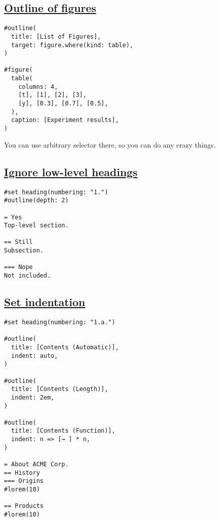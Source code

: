 \subsection{\texorpdfstring{\hyperref[outline-of-figures]{Outline of
figures}}{Outline of figures}}\label{outline-of-figures}

\begin{verbatim}
#outline(
  title: [List of Figures],
  target: figure.where(kind: table),
)

#figure(
  table(
    columns: 4,
    [t], [1], [2], [3],
    [y], [0.3], [0.7], [0.5],
  ),
  caption: [Experiment results],
)
\end{verbatim}

\pandocbounded{}

You can use arbitrary selector there, so you can do any crazy things.

\subsection{\texorpdfstring{\hyperref[ignore-low-level-headings]{Ignore
low-level
headings}}{Ignore low-level headings}}\label{ignore-low-level-headings}

\begin{verbatim}
#set heading(numbering: "1.")
#outline(depth: 2)

= Yes
Top-level section.

== Still
Subsection.

=== Nope
Not included.
\end{verbatim}

\pandocbounded{}

\subsection{\texorpdfstring{\hyperref[set-indentation]{Set
indentation}}{Set indentation}}\label{set-indentation}

\begin{verbatim}
#set heading(numbering: "1.a.")

#outline(
  title: [Contents (Automatic)],
  indent: auto,
)

#outline(
  title: [Contents (Length)],
  indent: 2em,
)

#outline(
  title: [Contents (Function)],
  indent: n => [→ ] * n,
)

= About ACME Corp.
== History
=== Origins
#lorem(10)

== Products
#lorem(10)
\end{verbatim}

